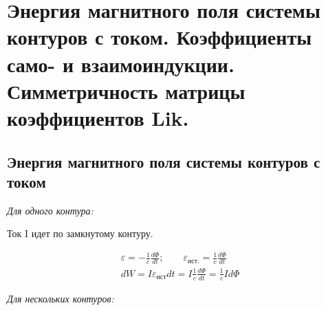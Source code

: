 \section{Энергия магнитного поля системы контуров с током. Коэффициенты само-
и взаимоиндукции. Симметричность матрицы коэффициентов Lik.}

\subsection*{Энергия магнитного поля системы контуров с током}

\textit{Для одного контура:}

Ток I идет по замкнутому контуру.

\begin{gather*}
    \varepsilon=-\frac{1}{c}\frac{d\Phi}{dt}; \qquad \varepsilon_{\text{ист.}}=\frac{1}{c}\frac{d\Phi}{dt} \\
    dW=I\varepsilon_{\text{ист}}dt=I \frac{1}{c}\frac{d\Phi}{dt}=\frac{1}{c}Id\Phi     
\end{gather*}

\textit{Для нескольких контуров:}

